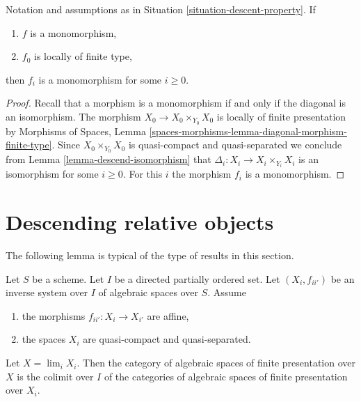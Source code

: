 \begin{lemma}
\label{lemma-descend-monomorphism}
Notation and assumptions as in Situation \ref{situation-descent-property}. If
\begin{enumerate}
\item $f$ is a monomorphism,
\item $f_0$ is locally of finite type,
\end{enumerate}
then $f_i$ is a monomorphism for some $i \geq 0$.
\end{lemma}

\begin{proof}
Recall that a morphism is a monomorphism if and only if the diagonal is
an isomorphism. The morphism $X_0 \to X_0 \times_{Y_0} X_0$ is locally of
finite presentation by
Morphisms of Spaces, Lemma
\ref{spaces-morphisms-lemma-diagonal-morphism-finite-type}.
Since $X_0 \times_{Y_0} X_0$ is quasi-compact and quasi-separated
we conclude from
Lemma \ref{lemma-descend-isomorphism}
that $\Delta_i : X_i \to X_i \times_{Y_i} X_i$ is an isomorphism for
some $i \geq 0$. For this $i$ the morphism $f_i$ is a monomorphism.
\end{proof}















\section{Descending relative objects}
\label{section-descending-relative}

\noindent
The following lemma is typical of the type of results in this section.

\begin{lemma}
\label{lemma-descend-finite-presentation}
Let $S$ be a scheme. Let $I$ be a directed partially ordered set.
Let $(X_i, f_{ii'})$ be an inverse system over $I$ of algebraic spaces
over $S$. Assume
\begin{enumerate}
\item the morphisms $f_{ii'} : X_i \to X_{i'}$ are affine,
\item the spaces $X_i$ are quasi-compact and quasi-separated.
\end{enumerate}
Let $X = \lim_i X_i$. Then the category of algebraic spaces
of finite presentation over $X$ is the colimit over $I$ of the
categories of algebraic spaces of finite presentation over $X_i$.
\end{lemma}

